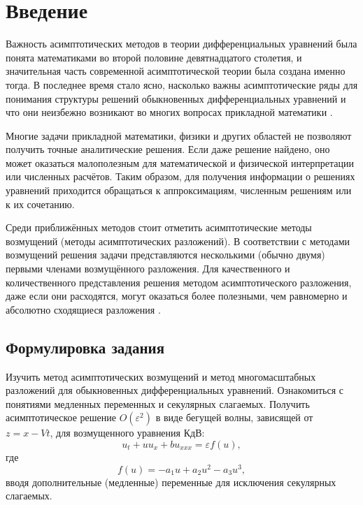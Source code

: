\chapter*{Введение}

Важность асимптотических методов
в теории дифференциальных уравнений
была понята математиками
во второй половине девятнадцатого столетия,
и значительная часть современной асимптотической теории
была создана именно тогда.
В последнее время стало ясно,
насколько важны асимптотические ряды
для понимания структуры решений обыкновенных дифференциальных уравнений
и что они неизбежно возникают во многих вопросах прикладной математики
\cite{vazov1968}.

Многие задачи прикладной математики, физики и других областей
не позволяют получить точные аналитические решения.
Если даже решение найдено,
оно может оказаться малополезным для
математической и физической интерпретации
или численных расчётов.
Таким образом, для получения информации
о решениях уравнений приходится
обращаться к аппроксимациям,
численным решениям или к их сочетанию.

Среди приближённых методов
стоит отметить асимптотические методы возмущений
(методы асимптотических разложений).
В соответствии с методами возмущений
решения задачи представляются
несколькими (обычно двумя)
первыми членами возмущённого разложения.
Для качественного и количественного представления
решения методом асимптотического разложения,
даже если они расходятся,
могут оказаться более полезными,
чем равномерно и абсолютно сходящиеся разложения
\cite{nayfeh1977}.

\section*{Формулировка задания}

Изучить метод асимптотических возмущений
и метод многомасштабных разложений
для обыкновенных дифференциальных уравнений.
Ознакомиться с понятиями медленных переменных
и секулярных слагаемых.
Получить асимптотическое решение  $O(\varepsilon^2)$
в виде бегущей волны, зависящей от $z=x-Vt$,
для возмущенного уравнения КдВ:
\begin{equation*}
    u_t + u u_x + b u_{xxx} = \varepsilon f(u),
\end{equation*}
где
\begin{equation*}
    f(u) = - a_1 u + a_2 u^2 - a_3 u^3,
\end{equation*}
вводя дополнительные (медленные) переменные
для исключения секулярных слагаемых.

